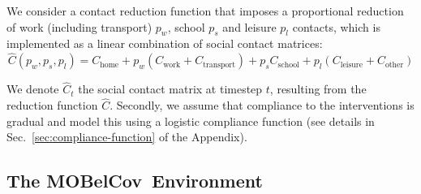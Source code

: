 \documentclass{article}
\newcommand{\chome}{C_{\text{home}}}
\newcommand{\cwork}{C_{\text{work}}}
\newcommand{\ctransport}{C_{\text{transport}}}
\newcommand{\cschool}{C_{\text{school}}}
\newcommand{\cleisure}{C_{\text{leisure}}}
\newcommand{\cother}{C_{\text{other}}}
\newcommand{\momdpname}{MOBelCov}
\begin{document}
We consider a contact reduction function that imposes a proportional reduction of work (including transport) $p_w$, school $p_s$ and leisure $p_l$ contacts, which is implemented as a linear combination of social contact matrices:
\begin{equation}
\label{eq:scm}
    \hat{C}(p_w, p_s, p_l) = \chome + p_w (\cwork + \ctransport) + p_s \cschool + p_l (\cleisure + \cother)
\end{equation}

We denote $\hat{C}_t$ the social contact matrix at timestep $t$, resulting from the reduction function $\hat{C}$. Secondly, we assume that compliance to the interventions is gradual and model this using a logistic compliance function (see details in Sec.~\ref{sec:compliance-function} of the Appendix).

\subsection{The \momdpname\ Environment}
\end{document}
